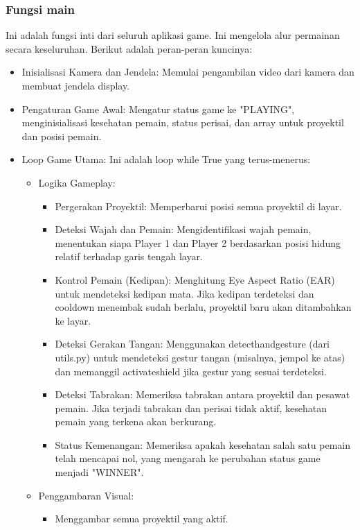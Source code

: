 \documentclass[11pt,a4paper]{article}
\begin{document}
\subsubsection{Fungsi main}
Ini adalah fungsi inti dari seluruh aplikasi game. Ini mengelola alur permainan secara keseluruhan. Berikut adalah peran-peran kuncinya:
\begin{itemize}
    \item Inisialisasi Kamera dan Jendela: Memulai pengambilan video dari kamera dan membuat jendela display.
    \item Pengaturan Game Awal: Mengatur status game ke "PLAYING", menginisialisasi kesehatan pemain, status perisai, dan array untuk proyektil dan posisi pemain.
    \item Loop Game Utama: Ini adalah loop while True yang terus-menerus:
    \begin{itemize}
        \item Logika Gameplay:
        \begin{itemize}
        \item Pergerakan Proyektil: Memperbarui posisi semua proyektil di layar.
        \item Deteksi Wajah dan Pemain: Mengidentifikasi wajah pemain, menentukan siapa Player 1 dan Player 2 berdasarkan posisi hidung relatif terhadap garis tengah layar.
        \item Kontrol Pemain (Kedipan): Menghitung Eye Aspect Ratio (EAR) untuk mendeteksi kedipan mata. Jika kedipan terdeteksi dan cooldown menembak sudah berlalu, proyektil baru akan ditambahkan ke layar.
        \item Deteksi Gerakan Tangan: Menggunakan detect\textunderscore hand\textunderscore gesture (dari utils.py) untuk mendeteksi gestur tangan (misalnya, jempol ke atas) dan memanggil activate\textunderscore shield jika gestur yang sesuai terdeteksi.
        \item Deteksi Tabrakan: Memeriksa tabrakan antara proyektil dan pesawat pemain. Jika terjadi tabrakan dan perisai tidak aktif, kesehatan pemain yang terkena akan berkurang.
        \item Status Kemenangan: Memeriksa apakah kesehatan salah satu pemain telah mencapai nol, yang mengarah ke perubahan status game menjadi "WINNER".
    \end{itemize}
    \item Penggambaran Visual:
    \begin{itemize}
        \item Menggambar semua proyektil yang aktif.

\end{itemize}
\end{itemize}
\end{itemize}
\end{document}
